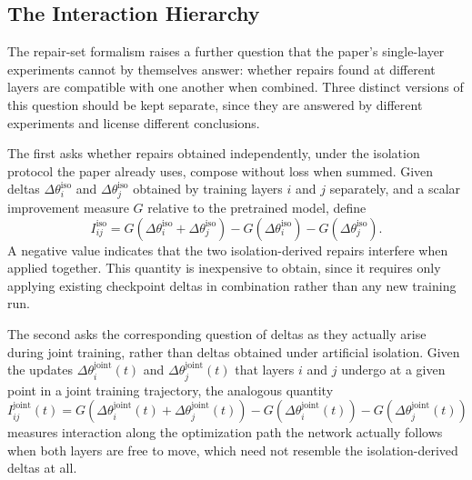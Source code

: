 \documentclass[11pt]{article}
\begin{document}
\subsection{The Interaction Hierarchy}

The repair-set formalism raises a further question that the paper's single-layer experiments cannot by themselves answer: whether repairs found at different layers are compatible with one another when combined. Three distinct versions of this question should be kept separate, since they are answered by different experiments and license different conclusions.

The first asks whether repairs obtained independently, under the isolation protocol the paper already uses, compose without loss when summed. Given deltas $\Delta\theta_i^{\mathrm{iso}}$ and $\Delta\theta_j^{\mathrm{iso}}$ obtained by training layers $i$ and $j$ separately, and a scalar improvement measure $G$ relative to the pretrained model, define
\[
I_{ij}^{\mathrm{iso}} = G\!\left(\Delta\theta_i^{\mathrm{iso}} + \Delta\theta_j^{\mathrm{iso}}\right) - G\!\left(\Delta\theta_i^{\mathrm{iso}}\right) - G\!\left(\Delta\theta_j^{\mathrm{iso}}\right).
\]
A negative value indicates that the two isolation-derived repairs interfere when applied together. This quantity is inexpensive to obtain, since it requires only applying existing checkpoint deltas in combination rather than any new training run.

The second asks the corresponding question of deltas as they actually arise during joint training, rather than deltas obtained under artificial isolation. Given the updates $\Delta\theta_i^{\mathrm{joint}}(t)$ and $\Delta\theta_j^{\mathrm{joint}}(t)$ that layers $i$ and $j$ undergo at a given point in a joint training trajectory, the analogous quantity
\[
I_{ij}^{\mathrm{joint}}(t) = G\!\left(\Delta\theta_i^{\mathrm{joint}}(t) + \Delta\theta_j^{\mathrm{joint}}(t)\right) - G\!\left(\Delta\theta_i^{\mathrm{joint}}(t)\right) - G\!\left(\Delta\theta_j^{\mathrm{joint}}(t)\right)
\]
measures interaction along the optimization path the network actually follows when both layers are free to move, which need not resemble the isolation-derived deltas at all.
\end{document}
